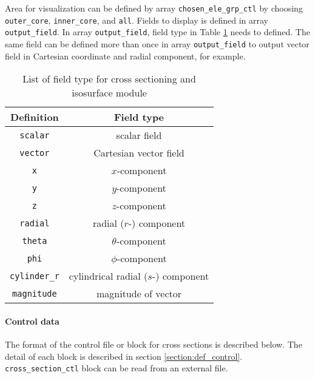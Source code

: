Area for visualization can be defined by array \verb|chosen_ele_grp_ctl| by choosing \verb|outer_core|, \verb|inner_core|, and \verb|all|. Fields to display is defined in array \verb|output_field|. In array \verb|output_field|, field type in Table \ref{table:field_type} needs to defined. The same field can be defined more than once in array \verb|output_field| to output vector field in Cartesian coordinate and radial component, for example.
%
\begin{table}[htp]
\caption{List of field type for cross sectioning and isosurface module}
\label{table:field_type}
\begin{center} 
\begin{tabular}{|c|c|}
\hline
 Definition & Field type  \\ \hline \hline
 \verb|scalar| & scalar field  \\ \hline
 \verb|vector| & Cartesian vector field \\ \hline
 \verb|x| & $x$-component  \\ \hline
 \verb|y| & $y$-component  \\ \hline
 \verb|z| & $z$-component  \\ \hline
 \verb|radial| & radial ($r$-) component  \\ \hline
 \verb|theta| & $\theta$-component  \\ \hline
 \verb|phi| & $\phi$-component  \\ \hline
 \verb|cylinder_r| & cylindrical radial ($s$-) component  \\ \hline
 \verb|magnitude| & magnitude of vector  \\ \hline
\end{tabular}
\end{center}
\end{table}
%
\paragraph{Control data} \label{section:section_control}
The format of the control file or block for cross sections is described below. The detail of each block is described in section \ref{section:def_control}.  \verb|cross_section_ctl| block can be read from an external file. 

